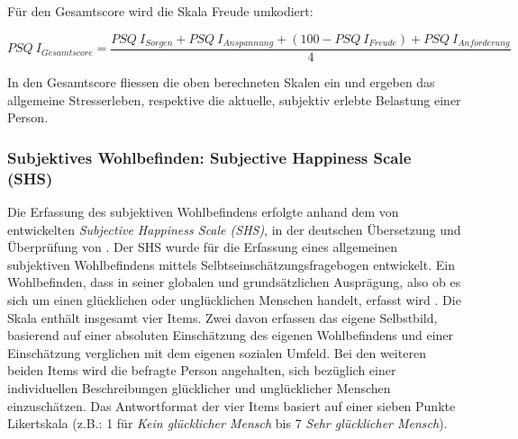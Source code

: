 Für den Gesamtscore wird die Skala Freude umkodiert:

\begin{equation}\label{eq:PSQGesamtscore}
    PSQ~I_{Gesamtscore}=\frac{PSQ~I_{Sorgen}+PSQ~I_{Anspannung}+ (100-PSQ~I_{Freude})+PSQ~I_{Anforderung}}{4}
\end{equation}

In den Gesamtscore fliessen die oben berechneten Skalen ein und ergeben das allgemeine Stresserleben, respektive die aktuelle, subjektiv erlebte Belastung einer Person.

\subsubsection{Subjektives Wohlbefinden: Subjective Happiness Scale (SHS)}\label{sec:SWB}
Die Erfassung des subjektiven Wohlbefindens erfolgte anhand dem von  entwickelten \textit{Subjective Happiness Scale (SHS)}, in der deutschen Übersetzung und Überprüfung von . Der SHS wurde für die Erfassung  eines allgemeinen subjektiven Wohlbefindens mittels Selbtseinschätzungsfragebogen entwickelt. Ein Wohlbefinden, dass in seiner globalen und grundsätzlichen Ausprägung, also ob es sich um einen glücklichen oder unglücklichen Menschen handelt, erfasst wird  \cite[S.~139ff]{Lyubomirsky1999}. Die Skala enthält insgesamt vier Items. Zwei davon erfassen das eigene Selbstbild, basierend auf einer absoluten Einschätzung des eigenen Wohlbefindens und einer Einschätzung verglichen mit dem eigenen sozialen Umfeld. Bei den weiteren beiden Items wird die befragte Person angehalten, sich bezüglich einer individuellen Beschreibungen glücklicher und unglücklicher Menschen einzuschätzen. Das Antwortformat der vier Items basiert auf einer sieben Punkte Likertskala (z.B.: 1 für \textit{Kein glücklicher Mensch} bis 7 \textit{Sehr glücklicher Mensch}). 

